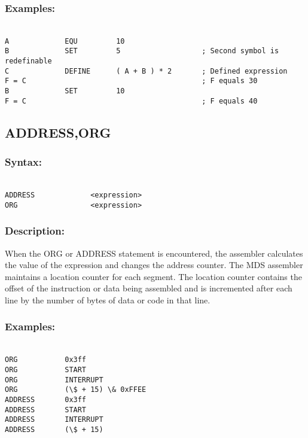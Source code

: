         \subsubsection{Examples:}
        {
            ~\\
            \usecodefont
            \verb'A             EQU         10'\\
            \verb'B             SET         5                   ; Second symbol is redefinable'\\
            \verb'C             DEFINE      ( A + B ) * 2       ; Defined expression'\\
            \verb'F = C                                         ; F equals 30'\\
            \verb'B             SET         10'\\
            \verb'F = C                                         ; F equals 40'\\
        }

    \subsection{ADDRESS,ORG}
        \subsubsection{Syntax:}
        {
            ~\\
            \usecodefont
            \verb'ADDRESS             <expression>'\\
            \verb'ORG                 <expression>'
        }
        \subsubsection{Description:}
        When the ORG or ADDRESS statement is encountered, the assembler calculates the value of the expression and changes the address counter. The MDS assembler maintains a location counter for each segment. The location counter contains the offset of the instruction or data being assembled and is incremented after each line by the number of bytes of data or code in that line.

        \subsubsection{Examples:}
        {
            ~\\
            \usecodefont
            \verb'ORG           0x3ff'\\
            \verb'ORG           START'\\
            \verb'ORG           INTERRUPT'\\
            \verb'ORG           (\$ + 15) \& 0xFFEE'\\
            \verb'ADDRESS       0x3ff'\\
            \verb'ADDRESS       START'\\
            \verb'ADDRESS       INTERRUPT'\\
            \verb'ADDRESS       (\$ + 15)'\\
        }
